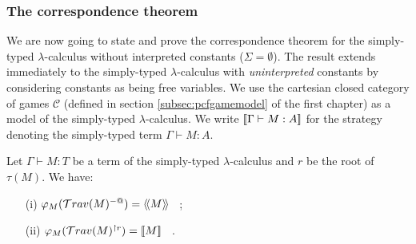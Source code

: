 \subsubsection{The correspondence theorem}
We are now going to state and prove the correspondence theorem
for the simply-typed $\lambda$-calculus without interpreted constants ($\Sigma = \emptyset$).
The result extends immediately to the simply-typed $\lambda$-calculus with \emph{uninterpreted} constants by considering constants as being free variables.
We use the cartesian closed category of games $\mathcal{C}$ (defined in section \ref{subsec:pcfgamemodel} of the first chapter) as
a model of the simply-typed $\lambda$-calculus. We write ${[\![ \Gamma \vdash M : A ]\!]}$ for the strategy denoting the simply-typed term
$\Gamma \vdash M : A$.

\begin{prop}
\label{prop:rel_gamesem_trav} Let $\Gamma \vdash M : T$ be a term of
the simply-typed $\lambda$-calculus and $r$ be the root of
$\tau(M)$. We have:
\begin{itemize}
\item[(i)]  $\varphi_M(\mathcal{T}rav(M)^{-@}) = {\langle\!\langle M \rangle\!\rangle}$ \ ;
\item[(ii)] $\varphi_M(\mathcal{T}rav(M)^{\upharpoonright r}) = {[\![ M ]\!]}$ \ .
\end{itemize}
\end{prop}


